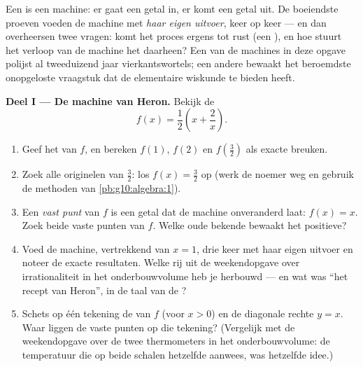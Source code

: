 \begin{problem}
\label{pb:g10:functions:1}
Een  is een machine: er gaat een getal in, er komt een getal uit. De
boeiendste proeven voeden de machine met \emph{haar eigen uitvoer}, keer op
keer --- en dan overheersen twee vragen: komt het proces ergens tot rust (een
\emph{}), en hoe stuurt het verloop van de machine het daarheen? Een
van de machines in deze opgave polijst al tweeduizend jaar vierkantswortels;
een andere bewaakt het beroemdste onopgeloste vraagstuk dat de elementaire
wiskunde te bieden heeft.

\medskip
\noindent\textbf{Deel I --- De machine van Heron.}
Bekijk de 
\[
f(x) = \frac12\left(x + \frac2x\right).
\]
\begin{enumerate}
  \item Geef het  van $f$, en bereken $f(1)$, $f(2)$ en
        $f\!\left(\frac32\right)$ als exacte breuken.
  \item Zoek alle originelen van $\frac32$: los $f(x) = \frac32$ op (werk de
        noemer weg en gebruik de methoden van \cref{pb:g10:algebra:1}).
  \item Een \emph{vast punt} van $f$ is een getal dat de
        machine onveranderd laat: $f(x) = x$. Zoek beide vaste punten van
        $f$. Welke oude bekende bewaakt het positieve?
  \item Voed de machine, vertrekkend van $x = 1$, drie keer met haar eigen
        uitvoer en noteer de exacte resultaten. Welke rij uit de
        weekendopgave over irrationaliteit in het onderbouwvolume heb je
        herbouwd --- en wat was ``het recept van Heron'', in de taal van de
        ?
  \item Schets op één tekening de  van $f$ (voor $x > 0$) en de
        diagonale rechte $y = x$. Waar liggen de vaste punten op die
        tekening? (Vergelijk met de weekendopgave over de twee thermometers
        in het onderbouwvolume: de temperatuur die op beide schalen hetzelfde
        aanwees, was hetzelfde idee.)
\end{enumerate}


\end{problem}
